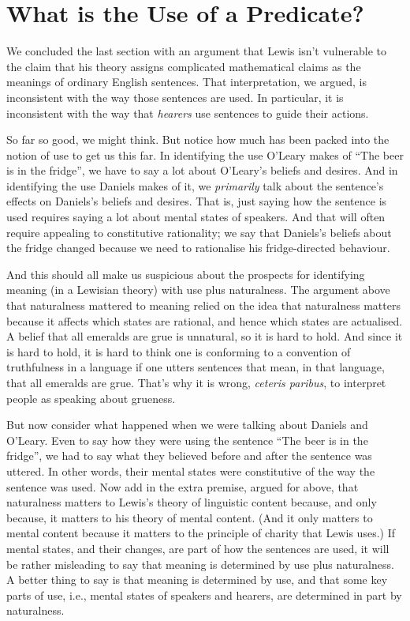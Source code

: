 \documentclass[
  10pt,
  letterpaper,
  DIV=11,
  numbers=noendperiod,
  twoside]{scrartcl}
\begin{document}
\section{What is the Use of a
Predicate?}\label{what-is-the-use-of-a-predicate}

We concluded the last section with an argument that Lewis isn't
vulnerable to the claim that his theory assigns complicated mathematical
claims as the meanings of ordinary English sentences. That
interpretation, we argued, is inconsistent with the way those sentences
are used. In particular, it is inconsistent with the way that
\emph{hearers} use sentences to guide their actions.

So far so good, we might think. But notice how much has been packed into
the notion of use to get us this far. In identifying the use O'Leary
makes of ``The beer is in the fridge'', we have to say a lot about
O'Leary's beliefs and desires. And in identifying the use Daniels makes
of it, we \emph{primarily} talk about the sentence's effects on
Daniels's beliefs and desires. That is, just saying how the sentence is
used requires saying a lot about mental states of speakers. And that
will often require appealing to constitutive rationality; we say that
Daniels's beliefs about the fridge changed because we need to
rationalise his fridge-directed behaviour.

And this should all make us suspicious about the prospects for
identifying meaning (in a Lewisian theory) with use plus naturalness.
The argument above that naturalness mattered to meaning relied on the
idea that naturalness matters because it affects which states are
rational, and hence which states are actualised. A belief that all
emeralds are grue is unnatural, so it is hard to hold. And since it is
hard to hold, it is hard to think one is conforming to a convention of
truthfulness in a language if one utters sentences that mean, in that
language, that all emeralds are grue. That's why it is wrong,
\emph{ceteris paribus}, to interpret people as speaking about grueness.

But now consider what happened when we were talking about Daniels and
O'Leary. Even to say how they were using the sentence ``The beer is in
the fridge'', we had to say what they believed before and after the
sentence was uttered. In other words, their mental states were
constitutive of the way the sentence was used. Now add in the extra
premise, argued for above, that naturalness matters to Lewis's theory of
linguistic content because, and only because, it matters to his theory
of mental content. (And it only matters to mental content because it
matters to the principle of charity that Lewis uses.) If mental states,
and their changes, are part of how the sentences are used, it will be
rather misleading to say that meaning is determined by use plus
naturalness. A better thing to say is that meaning is determined by use,
and that some key parts of use, i.e., mental states of speakers and
hearers, are determined in part by naturalness.
\end{document}
